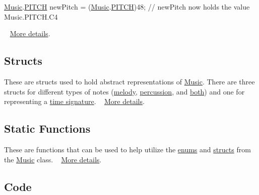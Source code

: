 \begin{DoxyCode}
\hyperlink{class_music}{Music}.\hyperlink{group___music_enums_ga508f69b199ea518f935486c990edac1d}{PITCH} newPitch = (\hyperlink{class_music}{Music}.\hyperlink{group___music_enums_ga508f69b199ea518f935486c990edac1d}{PITCH})48; \textcolor{comment}{// newPitch now holds the value Music.PITCH.C4 }
\end{DoxyCode}
 ~\newline
 \hyperlink{group___music_enums}{More details}.\hypertarget{group___doc_music_DocMusicStructs}{}\subsection{Structs}\label{group___doc_music_DocMusicStructs}
These are structs used to hold abstract representations of \hyperlink{class_music}{Music}. There are three structs for different types of notes (\hyperlink{group___music_structs_struct_music_1_1_melody_note}{melody}, \hyperlink{group___music_structs_struct_music_1_1_percussion_note}{percussion}, and \hyperlink{group___music_structs_struct_music_1_1_combined_note}{both}) and one for representing a \hyperlink{group___music_structs_struct_music_1_1_time_signature}{time signature}. ~\newline
 \hyperlink{group___music_structs}{More details}.\hypertarget{group___doc_music_DocMusicStatFunc}{}\subsection{Static Functions}\label{group___doc_music_DocMusicStatFunc}
These are functions that can be used to help utilize the \hyperlink{group___music_enums}{enums} and \hyperlink{group___music_structs}{structs} from the \hyperlink{class_music}{Music} class. ~\newline
 \hyperlink{group___music_stat_func}{More details}.\hypertarget{group___doc_music_DocMusicCode}{}\subsection{Code}\label{group___doc_music_DocMusicCode}


